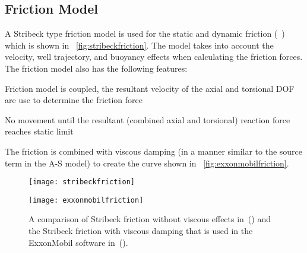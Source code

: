 \subsection{Friction Model}
\label{sec:exxonfrictionmodel}
A Stribeck type friction model is used for the static and dynamic friction (~\cite{ref:cayeux2020a}) which is shown in \figurename~\ref{fig:stribeckfriction}.  The model takes into account the velocity, well trajectory, and buoyancy effects when calculating the friction forces. The friction model also has the following features:
\begin{bulletedlist}
    \item Friction model is coupled, the resultant velocity of the axial and torsional DOF are use to determine the friction force
    \item No movement until the resultant (combined axial and torsional) reaction force reaches static limit
\end{bulletedlist}
The friction is combined with viscous damping (in a manner similar to the source term in the A-S model) to create the curve shown in \figurename~\ref{fig:exxonmobilfriction}.
\begin{figure}
	\begin{minipage}[t]{\linewidth}
			\begin{minipage}[t]{0.285\linewidth}
				\centering
				\texttt{[image: stribeckfriction]}
				\label{fig:stribeckfriction}
			\end{minipage}
			\hfill
			\begin{minipage}[t]{0.67\linewidth}
				\centering
				\texttt{[image: exxonmobilfriction]}
				\label{fig:exxonmobilfriction}
			\end{minipage}
	\end{minipage}
	\caption[Comparison of friction models]{A comparison of Stribeck friction without viscous effects in~() and the Stribeck friction with viscous damping that is used in the ExxonMobil software in~().}\label{fig:frictionmodels}
\end{figure}

